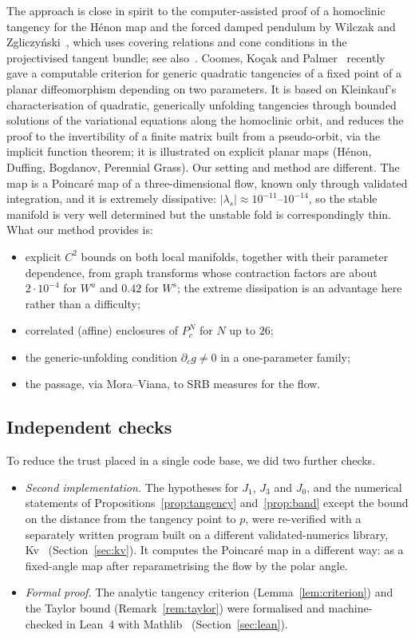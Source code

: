 \documentclass[11pt]{amsart}
\theoremstyle{definition}
\theoremstyle{remark}
\newcommand{\Wu}{W^u}
\newcommand{\Ws}{W^s}
\begin{document}
The approach is close in spirit to the computer-assisted proof of a homoclinic tangency for the H\'enon
map and the forced damped pendulum by Wilczak and Zgliczy\'nski~\cite{WZ09}, which uses covering
relations and cone conditions in the projectivised tangent bundle; see also~\cite{AM06}. Coomes, Ko\c
cak and Palmer~\cite{CKP26} recently gave a computable criterion for generic quadratic tangencies of a
fixed point of a planar diffeomorphism depending on two parameters. It is based on Kleinkauf's
characterisation of quadratic, generically unfolding tangencies through bounded solutions of the
variational equations along the homoclinic orbit, and reduces the proof to the invertibility of a finite
matrix built from a pseudo-orbit, via the implicit function theorem; it is illustrated on explicit
planar maps (H\'enon, Duffing, Bogdanov, Perennial Grass). Our setting and method are different. The
map is a Poincar\'e map of a three-dimensional flow, known only through validated integration, and it is
extremely dissipative: $|\lambda_s|\approx10^{-11}$--$10^{-14}$, so the stable manifold is very well
determined but the unstable fold is correspondingly thin. What our method provides is:
\begin{itemize}[leftmargin=*]
\item explicit $C^2$ bounds on both local manifolds, together with their parameter dependence, from
graph transforms whose contraction factors are about $2\cdot10^{-4}$ for $\Wu$ and $0.42$ for $\Ws$;
the extreme dissipation is an advantage here rather than a difficulty;
\item correlated (affine) enclosures of $P_c^N$ for $N$ up to $26$;
\item the generic-unfolding condition $\partial_cg\neq0$ in a one-parameter family;
\item the passage, via Mora--Viana, to SRB measures for the flow.
\end{itemize}

\subsection*{Independent checks}
To reduce the trust placed in a single code base, we did two further checks.
\begin{itemize}[leftmargin=*]
\item \emph{Second implementation.} The hypotheses for $J_1$, $J_3$ and $J_0$, and the numerical
statements of Propositions~\ref{prop:tangency} and~\ref{prop:band} except the bound on the distance from the tangency
point to $p$, were re-verified with a separately written program
built on a different validated-numerics library, Kv~\cite{Kv} (Section~\ref{sec:kv}). It computes the
Poincar\'e map in a different way: as a fixed-angle map after reparametrising the flow by the polar
angle.
\item \emph{Formal proof.} The analytic tangency criterion (Lemma~\ref{lem:criterion}) and the Taylor
bound (Remark~\ref{rem:taylor}) were formalised and machine-checked in Lean~4 with
Mathlib~\cite{Lean4,mathlib} (Section~\ref{sec:lean}).
\end{itemize}
\end{document}
